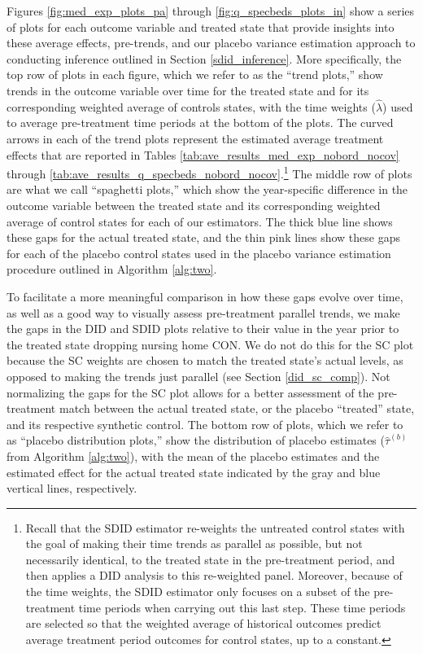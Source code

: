 \documentclass[../Main.tex]{subfiles}
\begin{document}
\indent Figures \ref{fig:med_exp_plots_pa} through \ref{fig:q_specbeds_plots_in} show a series of plots for each outcome variable and treated state that provide insights into these average effects, pre-trends, and our placebo variance estimation approach to conducting inference outlined in Section \ref{sdid_inference}. More specifically, the top row of plots in each figure, which we refer to as the ``trend plots,'' show trends in the outcome variable over time for the treated state and for its corresponding weighted average of controls states, with the time weights ($\hat{\lambda}$) used to average pre-treatment time periods at the bottom of the plots. The curved arrows in each of the trend plots represent the estimated average treatment effects that are reported in Tables \ref{tab:ave_results_med_exp_nobord_nocov} through \ref{tab:ave_results_q_specbeds_nobord_nocov}.\footnote{Recall that the SDID estimator re-weights the untreated control states with the goal of making their time trends as parallel as possible, but not necessarily identical, to the treated state in the pre-treatment period, and then applies a DID analysis to this re-weighted panel. Moreover, because of the time weights, the SDID estimator only focuses on a subset of the pre-treatment time periods when carrying out this last step. These time periods are selected so that the weighted average of historical outcomes predict average treatment period outcomes for control states, up to a constant.} The middle row of plots are what we call ``spaghetti plots,'' which show the year-specific difference in the outcome variable between the treated state and its corresponding weighted average of control states for each of our estimators. The thick blue line shows these gaps for the actual treated state, and the thin pink lines show these gaps for each of the placebo control states used in the placebo variance estimation procedure outlined in Algorithm \ref{alg:two}. 

To facilitate a more meaningful comparison in how these gaps evolve over time, as well as a good way to visually assess pre-treatment parallel trends, we make the gaps in the DID and SDID plots relative to their value in the year prior to the treated state dropping nursing home CON. We do not do this for the SC plot because the SC weights are chosen to match the treated state's actual levels, as opposed to making the trends just parallel (see Section \ref{did_sc_comp}). Not normalizing the gaps for the SC plot allows for a better assessment of the pre-treatment match between the actual treated state, or the placebo ``treated'' state, and its respective synthetic control. The bottom row of plots, which we refer to as ``placebo distribution plots,'' show the distribution of placebo estimates ($\hat{\tau}^{(b)}$ from Algorithm \ref{alg:two}), with the mean of the placebo estimates and the estimated effect for the actual treated state indicated by the gray and blue vertical lines, respectively.
\end{document}
